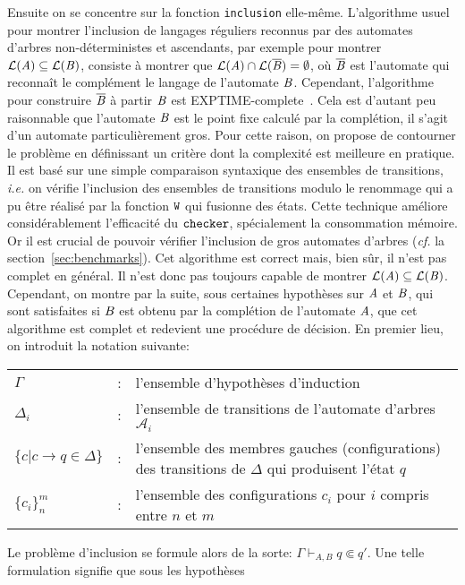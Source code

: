 Ensuite on se concentre sur la fonction \lstinline!inclusion! elle-même. 
L'algorithme usuel pour montrer l'inclusion de langages réguliers reconnus
par des automates d'arbres non-déterministes et ascendants, par exemple
pour montrer $\mathcal{L}(\mathit A) \subseteq \mathcal{L}(\mathit B)$, consiste à montrer que $\mathcal{L}(\mathit A) \cap
\mathcal{L}(\overline{\mathit B}) =\emptyset$, où $\overline{\mathit B}$ est l'automate qui reconnaît le complément 
le langage de l'automate $\mathit B$. Cependant, l'algorithme pour construire $\overline{\mathit B}$ à partir
$\mathit B$ est EXPTIME-complete~\cite{TATA}. Cela est d'autant peu raisonnable que l'automate $\mathit B$ est
le point fixe calculé par la complétion, il s'agit d'un automate particulièrement gros.
Pour cette raison, on propose de contourner le problème en définissant un critère dont
la complexité est meilleure en pratique. Il est basé sur une simple comparaison syntaxique
des ensembles de transitions, \textit{i.e.} on vérifie l'inclusion des ensembles de transitions
modulo le renommage qui a pu être réalisé par la fonction $\mathtt{W}$ qui fusionne des états.
Cette technique améliore considérablement l'efficacité du $\mathtt{checker}$, spécialement la consommation
mémoire. Or il est crucial de pouvoir vérifier l'inclusion de gros automates d'arbres (\textit{cf.}
la section~\ref{sec:benchmarks}). Cet algorithme est correct mais, bien sûr, il n'est pas 
complet en général. Il n'est donc pas toujours capable de montrer $\mathcal{L}(\mathit A) \subseteq \mathcal{L}(\mathit B)$.
Cependant, on montre par la suite, sous certaines hypothèses sur $\mathit A$ et $\mathit B$, qui sont satisfaites
si $\mathit B$ est obtenu par la complétion de l'automate $\mathit A$, que cet algorithme est complet et redevient une procédure de
décision. En premier lieu, on introduit la notation suivante:
{\small
\begin{center}
  \begin{tabular}[c]{lcp{10cm}}
    $\Gamma$    & : & l'ensemble d'hypothèses d'induction\\
    $\Delta_i$  & : & l'ensemble de transitions de l'automate d'arbres $\mathcal{A}_i$\\
    $\{c|c \rightarrow q \in \Delta\}$ & : & l'ensemble des membres gauches (configurations) des transitions de $\Delta$ qui produisent l'état $q$\\
    $\{c_i\}_n^m$ & : & l'ensemble des configurations $c_i$ pour $i$ compris entre $n$ et $m$\\
  \end{tabular}
\end{center}
} Le problème d'inclusion se formule alors de la sorte: ${\Gamma
  \vdash_{A, B} q \Subset q'}$. Une telle formulation signifie que sous les hypothèses
